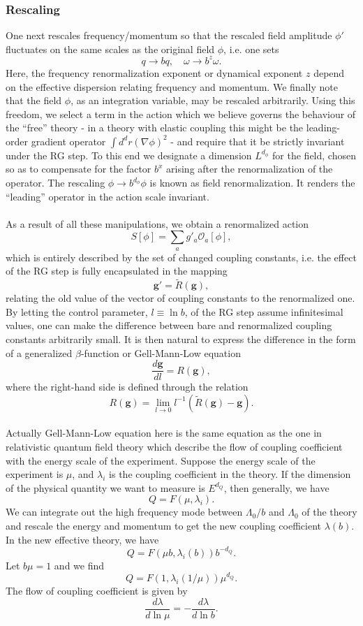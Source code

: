 \subsubsection{Rescaling}
One next rescales frequency/momentum so that the rescaled field amplitude $\phi'$ fluctuates on the same scales as the original field $\phi$, i.e. one sets
\[q \to bq , \quad \omega \to b^z \omega.\]
Here, the frequency renormalization exponent or dynamical exponent $z$ depend on the effective dispersion relating
frequency and momentum. 
We finally note that the field $\phi$, as an integration variable, may be rescaled arbitrarily. Using this freedom, we select a term in the action which we believe governs the behaviour of the ``free'' theory - in a theory with elastic coupling this might be the leading-order gradient operator $\int d^d r (\nabla \phi)^2$ - and require that it be strictly invariant under the RG step. 
To this end we designate a dimension $L^{d_{\phi}}$ for the field, chosen so as to compensate for the factor $b^x$ arising after the renormalization of the operator. The rescaling $\phi \to b^{d_{\phi}} \phi$ is known as field renormalization. It renders the ``leading'' operator in the action scale invariant.
\\ \\
As a result of all these manipulations, we obtain a renormalized action
\[S[\phi] = \sum_a g'_a \mathcal{O}_a[\phi],\]
which is entirely described by the set of changed coupling constants, i.e. the effect of the RG step is fully encapsulated in the mapping
\[\bm{g}' = \tilde{R}(\bm{g}),\]
relating the old value of the vector of coupling constants to the renormalized one. 
By letting the control parameter, $l \equiv \ln b$, of the RG step assume infinitesimal values, one can make the difference between bare and renormalized coupling constants
arbitrarily small. 
It is then natural to express the difference in the form of a generalized $\beta$-function or Gell-Mann-Low equation
\[\frac{d\bm{g}}{dl} = R(\bm{g}),\]
where the right-hand side is defined through the relation
\[R(\bm{g}) = \lim_{l \to 0} l^{-1} (\tilde{R}(\bm{g}) - \bm{g}).\]
\\
Actually Gell-Mann-Low equation here is the same equation as the one in relativistic quantum field theory which describe the flow of coupling coefficient with the energy scale of the experiment. 
Suppose the energy scale of the experiment is $\mu$, and $\lambda_i$ is the coupling coefficient in the theory. 
If the dimension of the physical quantity we want to measure is $E^{d_Q}$, then generally, we have
\[Q = F\left(\mu, \lambda_i\right).\]
We can integrate out the high frequency mode between $\Lambda_0/b$ and $\Lambda_0$ of the theory and rescale the energy and momentum to get the new coupling coefficient $\lambda(b)$. 
In the new effective theory, we have
\[Q = F\left(\mu b, \lambda_i(b) \right)b^{-d_{Q}}.\]
Let $b\mu = 1$ and we find
\[Q = F\left(1, \lambda_i(1/\mu) \right)\mu^{d_{Q}}.\]
The flow of coupling coefficient is given by
\[\frac{d\lambda}{d\ln \mu} = - \frac{d\lambda}{d\ln b}.\]

